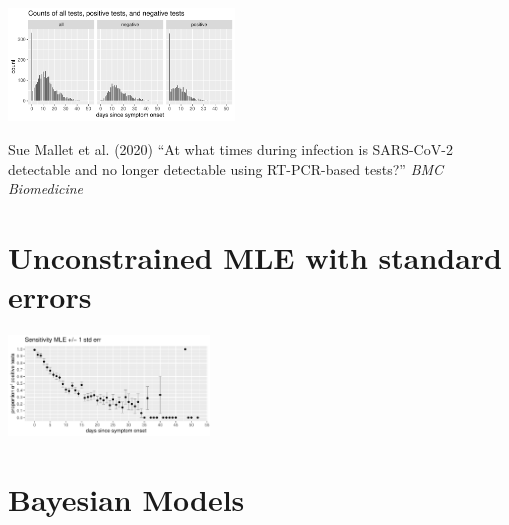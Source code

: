 \documentclass[plainboxedsections]{sciposter}
\begin{document}
\begin{multicols}{2}
\begin{center}
  \includegraphics[width=0.45\textwidth]{img/data-counts.pdf}
\end{center}

{\small Sue Mallet et al. (2020) ``At what times during infection is SARS-CoV-2 detectable and no longer detectable using RT-PCR-based tests?'' {\slshape BMC Biomedicine}}

\section{Unconstrained MLE with standard errors}


\begin{center}
\includegraphics[width=0.4\textwidth]{img/mle.pdf}
\end{center}

\columnbreak

\section{Bayesian Models}
\newcommand{\ilogit}{\textrm{logit}^{-1}}


\end{multicols}
\end{document}
